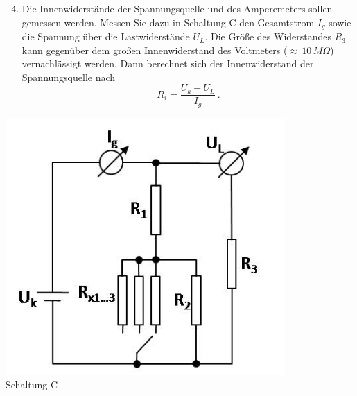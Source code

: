 \begin{minipage}[b]{0.6\textwidth}
\begin{enumerate} \setcounter{enumi}{3}
 \item Die Innenwiderstände der Spannungsquelle und des Amperemeters sollen gemessen werden. Messen Sie dazu in Schaltung C den Gesamtstrom $I_g$ sowie die Spannung über die Lastwiderstände $U_L$. Die Größe des Widerstandes $R_3$ kann gegenüber dem großen Innenwiderstand des Voltmeters ($\approx\, 10\,M\Omega$) vernachlässigt werden. Dann berechnet sich der Innenwiderstand der Spannungsquelle nach
 \begin{equation}
  R_i = \frac{U_k - U_L}{I_g}\, .
 \end{equation}
\end{enumerate}
\end{minipage}
%
\begin{minipage}[b]{0.35\textwidth}
 \centering
 \includegraphics[width=0.8\textwidth]{Versuch_13-14/Abbildungen/SchaltungC.jpg}\\
 Schaltung C
\end{minipage}


